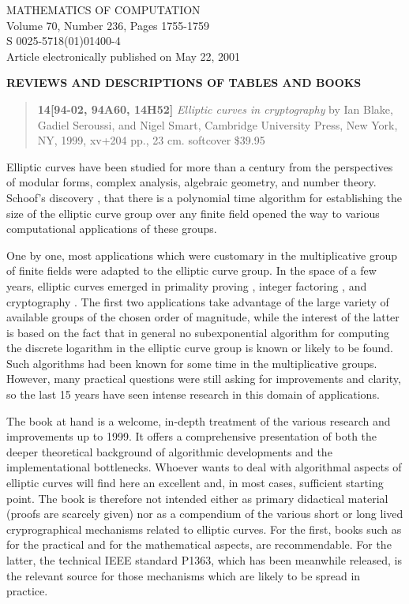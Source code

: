 \documentclass[final]{mcom-l}
\begin{document}

{\scriptsize
\noindent MATHEMATICS OF COMPUTATION\\
Volume 70, Number 236, Pages 1755-1759\\
S 0025-5718(01)01400-4\\
Article electronically published on May 22, 2001}\bigskip\bigskip

\centerline{\textbf{REVIEWS AND DESCRIPTIONS OF TABLES AND BOOKS}}\bigskip\bigskip

\begin{quote}\noindent \textbf{14[94-02, 94A60, 14H52]} \emph{Elliptic
curves in cryptography} by {Ian Blake, Gadiel Seroussi, and Nigel
Smart}, {Cambridge University Press}, {New York, NY}, {1999},
{xv+204} pp.,  {23} cm. {softcover} \$39.95\end{quote}\bigskip

Elliptic curves have been studied for more than a century from the
perspectives of modular forms, complex analysis, algebraic geometry, and number
theory.  Schoof's discovery \cite[1984]{10}, that there is a polynomial time
algorithm for establishing the size of the elliptic curve group over any finite
field opened the way to various computational applications of these groups.

One by one, most applications which were customary in the multiplicative group
of finite fields were adapted to the elliptic curve group.  In the space of a
few years, elliptic curves emerged in primality proving \cite{5}, integer
factoring \cite{6}, and cryptography \cite{8}.  The first two applications take
advantage of the large variety of available groups of the chosen order of
magnitude, while the interest of the latter is based on the fact that in
general no subexponential algorithm for computing the discrete logarithm in the
elliptic curve group is known or likely to be found.  Such algorithms had been
known for some time in the multiplicative groups.  However, many practical
questions were still asking for improvements and clarity, so the last 15 years
have seen intense research in this domain of applications.

The book at hand is a welcome, in-depth treatment of the various research and
improvements up to 1999.  It offers a comprehensive presentation of both the
deeper theoretical background of algorithmic developments and the
implementational bottlenecks.  Whoever wants to deal with algorithmal aspects
of elliptic curves will find here an excellent  and, in most cases, sufficient
starting point.  The book is therefore not intended either as primary
didactical material (proofs are scarcely given) nor as
a compendium of the various
short or long lived cryprographical mechanisms related to elliptic curves.  For
the first, books such as \cite{7} for the practical and \cite{3} for the
mathematical aspects, are recommendable.  For the latter, the technical IEEE
standard P1363, which has been meanwhile released, is the relevant source for
those mechanisms which are likely to be spread in practice.
\end{document}
